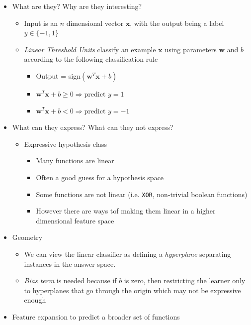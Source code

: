 \documentclass{article}
\begin{document}
\hspace{-1.5em}{\large \bf Linear Classifiers}
\begin{itemize}
\item What are they? Why are they interesting?
	\begin{itemize}
	\item Input is an $n$ dimensional vector $\mathbf{x}$, with the output being a label $y\in \{-1,1\}$
	\item {\em Linear Threshold Units} classify an example $\mathbf{x}$ using parameters $\mathbf{w}$ and $b$ according to the following classification rule
		\begin{itemize}
		\item Output = sign$(\mathbf{w}^{T}\mathbf{x} + b)$
		\item $\mathbf{w}^{T}\mathbf{x} + b \geq 0 \Rightarrow \text{predict } y = 1$
		\item $\mathbf{w}^{T}\mathbf{x} + b < 0 \Rightarrow \text{predict } y = -1$
		\end{itemize}
	\end{itemize}
\item What can they express? What can they not express?
	\begin{itemize}
	\item Expressive hypothesis class
		\begin{itemize}
		\item Many functions are linear
		\item Often a good guess for a hypothesis space
		\item Some functions are not linear (i.e. \verb~XOR~, non-trivial boolean functions)
		\item However there are ways tof making them linear in a higher dimensional feature space
		\end{itemize}
	\end{itemize}
\item Geometry
	\begin{itemize}
	\item We can view the linear classifier as defining a {\em hyperplane} separating instances in the answer space.
	\item {\em Bias term} is needed because if $b$ is zero, then restricting the learner only to hyperplanes that go through the origin which may not be expressive enough
	\end{itemize}
\item Feature expansion to predict a broader set of functions
	\begin{itemize}

\end{itemize}
\end{itemize}
\end{document}
